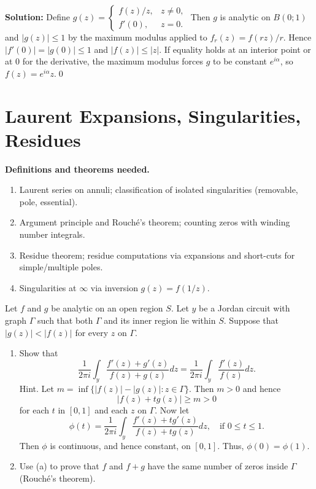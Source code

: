 \bigskip\noindent\textbf{Solution:}
Define $g(z)=\begin{cases} f(z)/z,& z\ne0,\\ f'(0),& z=0.\end{cases}$ Then $g$ is analytic on $B(0;1)$ and $|g(z)|\le1$ by the maximum modulus applied to $f_r(z)=f(rz)/r$. Hence $|f'(0)|=|g(0)|\le1$ and $|f(z)|\le |z|$. If equality holds at an interior point or at $0$ for the derivative, the maximum modulus forces $g$ to be constant $e^{i\alpha}$, so $f(z)=e^{i\alpha}z$.\qed
\section{Laurent Expansions, Singularities, Residues}

\noindent\textbf{Definitions and theorems needed.}
\begin{enumerate}[label=(\alph*)]
\item Laurent series on annuli; classification of isolated singularities (removable, pole, essential).
\item Argument principle and Rouché's theorem; counting zeros with winding number integrals.
\item Residue theorem; residue computations via expansions and short-cuts for simple/multiple poles.
\item Singularities at $\infty$ via inversion $g(z)=f(1/z)$.
\end{enumerate}



\begin{problembox}
Let \( f \) and \( g \) be analytic on an open region \( S \). Let \( y \) be a Jordan circuit with graph \( \Gamma \) such that both \( \Gamma \) and its inner region lie within \( S \). Suppose that \( |g(z)| < |f(z)| \) for every \( z \) on \( \Gamma \).
\begin{enumerate}[label=(\alph*)]
\item Show that
\[ \frac{1}{2\pi i} \int_{y} \frac{f'(z) + g'(z)}{f(z) + g(z)} dz = \frac{1}{2\pi i} \int_{y} \frac{f'(z)}{f(z)} dz. \]
Hint. Let \( m = \inf \{ |f(z)| - |g(z)| : z \in \Gamma \} \). Then \( m > 0 \) and hence
\[ |f(z) + t g(z)| \geq m > 0 \]
for each \( t \) in \( [0, 1] \) and each \( z \) on \( \Gamma \). Now let
\[ \phi(t) = \frac{1}{2\pi i} \int_{y} \frac{f'(z) + t g'(z)}{f(z) + t g(z)} dz, \quad \text{if } 0 \leq t \leq 1. \]
Then \( \phi \) is continuous, and hence constant, on \( [0, 1] \). Thus, \( \phi(0) = \phi(1) \).
\item Use (a) to prove that \( f \) and \( f + g \) have the same number of zeros inside \(\Gamma\) (Rouché's theorem).
\end{enumerate}
\end{problembox}


